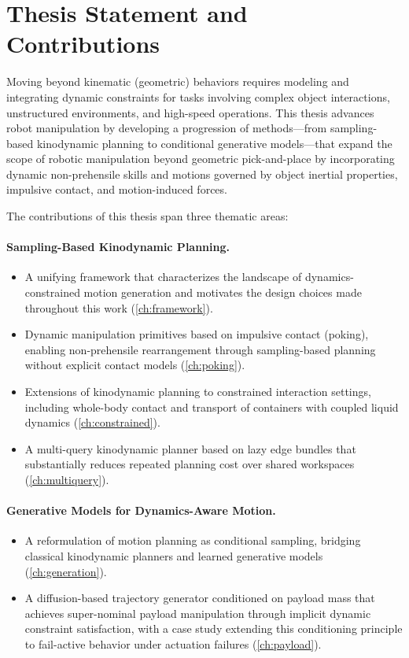 \section{Thesis Statement and Contributions}
\label{sec:intro:contributions}

Moving beyond kinematic (geometric) behaviors requires modeling and integrating dynamic constraints for tasks involving complex object interactions, unstructured environments, and high-speed operations.
This thesis advances robot manipulation by developing a progression of methods---from sampling-based kinodynamic planning to conditional generative models---that expand the scope of robotic manipulation beyond geometric pick-and-place by incorporating dynamic non-prehensile skills and motions governed by object inertial properties, impulsive contact, and motion-induced forces.

The contributions of this thesis span three thematic areas:

\paragraph{Sampling-Based Kinodynamic Planning.}
\begin{itemize}
  \item A unifying framework that characterizes the landscape of dynamics-constrained motion generation and motivates the design choices made throughout this work (\cref{ch:framework}).
  \item Dynamic manipulation primitives based on impulsive contact (poking), enabling non-prehensile rearrangement through sampling-based planning without explicit contact models (\cref{ch:poking}).
  \item Extensions of kinodynamic planning to constrained interaction settings, including whole-body contact and transport of containers with coupled liquid dynamics (\cref{ch:constrained}).
  \item A multi-query kinodynamic planner based on lazy edge bundles that substantially reduces repeated planning cost over shared workspaces (\cref{ch:multiquery}).
\end{itemize}

\paragraph{Generative Models for Dynamics-Aware Motion.}
\begin{itemize}
  \item A reformulation of motion planning as conditional sampling, bridging classical kinodynamic planners and learned generative models (\cref{ch:generation}).
  \item A diffusion-based trajectory generator conditioned on payload mass that achieves super-nominal payload manipulation through implicit dynamic constraint satisfaction, with a case study extending this conditioning principle to fail-active behavior under actuation failures (\cref{ch:payload}).
\end{itemize}


